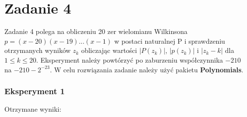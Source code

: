 \documentclass[12pt]{article}
\begin{document}
\section{Zadanie 4}
Zadanie 4 polega na obliczeniu 20 zer wielomianu Wilkinsona $p=(x-20)(x-19)...(x-1)$ w postaci naturalnej P i sprawdzeniu otrzymanych wyników $z_k$ obliczając wartości $|P(z_k)|$, $|p(z_k)|$ i $|z_k-k|$ dla $1 \leq k \leq 20$. Eksperyment należy powtórzyć po zaburzeniu współczynnika $-210$ na $-210-2^{-23}$. W celu rozwiązania zadanie należy użyć pakietu \textbf{Polynomials}.

\newpage
\subsubsection*{Eksperyment 1}
Otrzymane wyniki:
\end{document}
